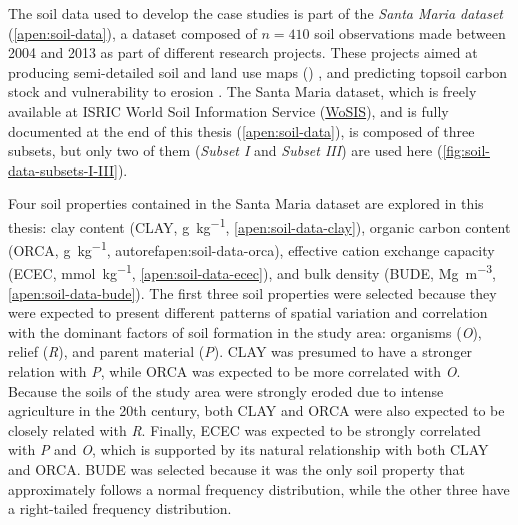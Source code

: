 The soil data used to develop the case studies is part of the \emph{Santa Maria dataset} 
(\autoref{apen:soil-data}), a dataset composed of $n = 410$ soil observations made between \num{2004} and 
\num{2013} as part of different research projects. These projects aimed at producing semi-detailed soil and 
land use maps () \cite{Pedron2005, Miguel2010, SamuelRosaEtAl2011a, MiguelEtAl2012, 
Samuel-RosaEtAl2013}, and predicting topsoil carbon stock and vulnerability to erosion \cite{Samuel-Rosa2009, 
MouraBueno2012, Miguel2013}. The Santa Maria dataset, which is freely available at ISRIC World Soil Information 
Service (\href{http://www.isric.org/data/wosis}{WoSIS}), and is fully documented at the end of this thesis 
(\autoref{apen:soil-data}), is composed of three subsets, but only two of them (\emph{Subset I} and 
\emph{Subset III}) are used here (\autoref{fig:soil-data-subsets-I-III}).

Four soil properties contained in the Santa Maria dataset are explored in this thesis: clay content (CLAY, 
\si{\gram\per\kilo\gram}, \autoref{apen:soil-data-clay}), organic carbon content (ORCA, 
\si{\gram\per\kilo\gram}, autoref{apen:soil-data-orca}), effective cation exchange capacity (ECEC, 
\si{\milli\mole\per\kilo\gram}, \autoref{apen:soil-data-ecec}), and bulk density (BUDE, 
\si{\mega\gram\per\cubic\metre}, \autoref{apen:soil-data-bude}). The first three soil properties were selected 
because they were expected to present different patterns of spatial variation and correlation with the dominant 
factors of soil formation in the study area: organisms (\textit{O}), relief (\textit{R}), and parent material 
(\textit{P}). CLAY was presumed to have a stronger relation with \textit{P}, while ORCA was expected to be more 
correlated with \textit{O}. Because the soils of the study area were strongly eroded due to intense agriculture 
in the 20th century, both CLAY and ORCA were also expected to be closely related with \textit{R}. Finally, ECEC 
was expected to be strongly correlated with \textit{P} and \textit{O}, which is supported by its natural 
relationship with both CLAY and
ORCA. BUDE was selected because it was the only soil property that approximately follows a normal frequency 
distribution, while the other three have a right-tailed frequency distribution.

